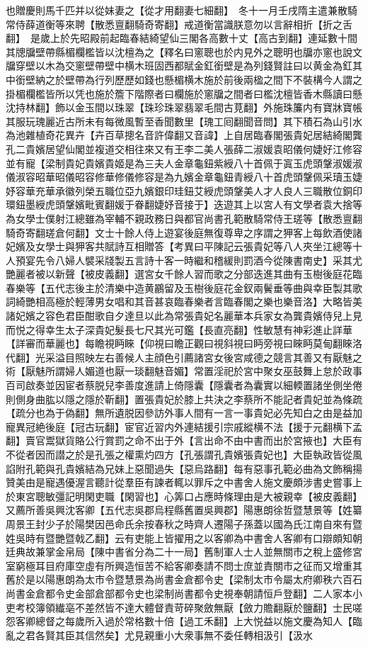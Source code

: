 也贈慶則馬千匹并以從妹妻之【從才用翻妻七細翻】　冬十一月壬戌隋主遣兼散騎常侍薛道衡等來聘【散悉亶翻騎奇寄翻】戒道衡當識朕意勿以言辭相折【折之舌翻】　是歲上於先昭殿前起臨春結綺望仙三閣各高數十丈【高古到翻】連延數十間其牕牖壁帶縣楣欄檻皆以沈檀為之【釋名曰窻聰也於内見外之聰明也牖亦窻也說文牖穿壁以木為交窻壁帶壁中横木班固西都賦金釭銜壁是為列錢賢註曰以黄金為釭其中銜壁納之於壁帶為行列歷歷如錢也懸楣横木施於前後兩楹之間下不裝構今人謂之掛楣欄檻皆所以凭也施於簷下階際者曰欄施於窻牖之間者曰檻沈檀皆香木縣讀曰懸沈持林翻】飾以金玉間以珠翠【珠珍珠翠翡翠毛間古莧翻】外施珠簾内有寶牀寶帳其服玩瑰麗近古所未有每微風暫至香聞數里【瑰工囘翻聞音問】其下積石為山引水為池雜植奇花異卉【卉百草摠名音許偉翻又音諱】上自居臨春閣張貴妃居結綺閣龔孔二貴嬪居望仙閣並複道交相往來又有王李二美人張薛二淑媛袁昭儀何婕好江修容並有寵【梁制貴妃貴嬪貴姬是為三夫人金章龜鈕紫綬八十首佩于寘玉虎頭鞶淑媛淑儀淑容昭華昭儀昭容修華修儀修容是為九嬪金章龜鈕青綬八十首虎頭鞶佩采瓄玉婕妤容華充華承徽列榮五職位亞九嬪銀印珪鈕艾綬虎頭鞶美人才人良人三職散位銅印環鈕墨綬虎頭鞶嬪毗賓翻媛于眷翻婕妤音接于】迭遊其上以宮人有文學者袁大捨等為女學士僕射江總雖為宰輔不親政務日與都官尚書孔範散騎常侍王瑳等【散悉亶翻騎奇寄翻瑳倉何翻】文士十餘人侍上遊宴後庭無復尊卑之序謂之狎客上每飲酒使諸妃嬪及女學士與狎客共賦詩互相贈答【考異曰平陳記云張貴妃等八人夾坐江總等十人預宴先令八婦人襞采牋製五言詩十客一時繼和稽緩則罰酒今從陳書南史】采其尤艷麗者被以新聲【被皮義翻】選宮女千餘人習而歌之分部迭進其曲有玉樹後庭花臨春樂等【五代志後主於清樂中造黄鸝留及玉樹後庭花金釵兩鬢垂等曲與幸臣製其歌詞綺艷相高極於輕薄男女唱和其音甚哀臨春樂者言臨春閣之樂也樂音洛】大略皆美諸妃嬪之容色君臣酣歌自夕達旦以此為常張貴妃名麗華本兵家女為龔貴嬪侍兒上見而悦之得幸生太子深貴妃髮長七尺其光可鑑【長直亮翻】性敏慧有神彩進止詳華【詳審而華麗也】每瞻視眄睞【仰視曰瞻正觀曰視斜視曰眄旁視曰睞眄莫甸翻睞洛代翻】光采溢目照映左右善候人主顔色引薦諸宮女後宮咸德之競言其善又有厭魅之術【厭魅所謂婦人媚道也厭一琰翻魅音媚】常置淫祀於宮中聚女巫鼓舞上怠於政事百司啟奏並因宦者蔡脱兒李善度進請上倚隱囊【隱囊者為囊實以細輭置諸坐側坐倦則側身曲肱以隱之隱於靳翻】置張貴妃於膝上共決之李蔡所不能記者貴妃並為條疏【疏分也為于偽翻】無所遺脱因參訪外事人間有一言一事貴妃必先知白之由是益加寵異冠絶後庭【冠古玩翻】宦官近習内外連結援引宗戚縱横不法【援于元翻横下孟翻】賣官鬻獄貨賂公行賞罰之命不出于外【言出命不由中書而出於宮掖也】大臣有不從者因而譛之於是孔張之權熏灼四方【孔張謂孔貴嬪張貴妃也】大臣執政皆從風諂附孔範與孔貴嬪結為兄妹上惡聞過失【惡烏路翻】每有惡事孔範必曲為文飾稱揚贊美由是寵遇優渥言聽計從羣臣有諫者輒以罪斥之中書舍人施文慶頗涉書史嘗事上於東宮聰敏彊記明閑吏職【閑習也】心筭口占應時條理由是大被親幸【被皮義翻】又薦所善吳興沈客卿【五代志吳郡烏程縣舊置吳興郡】陽惠朗徐哲暨慧景等【姓纂周景王封少子於陽樊因邑命氏余按春秋之時齊人遷陽子孫蓋以國為氏江南自來有暨姓吳時有暨艷暨戟乙翻】云有吏能上皆擢用之以客卿為中書舍人客卿有口辯頗知朝廷典故兼掌金帛局【陳中書省分為二十一局】舊制軍人士人並無關市之稅上盛修宮室窮極耳目府庫空虛有所興造恒苦不給客卿奏請不問士庶並責關市之征而又增重其舊於是以陽惠朗為太市令暨慧景為尚書金倉都令史【梁制太市令屬太府卿秩六百石尚書金倉都令史金部倉部都令史也梁制尚書都令史視奉朝請恒戶登翻】二人家本小吏考校簿領纎亳不差然皆不達大體督責苛碎聚斂無厭【斂力贍翻厭於鹽翻】士民嗟怨客卿總督之每歲所入過於常格數十倍【過工禾翻】上大悦益以施文慶為知人【臨亂之君各賢其臣其信然矣】尤見親重小大衆事無不委任轉相汲引【汲水
